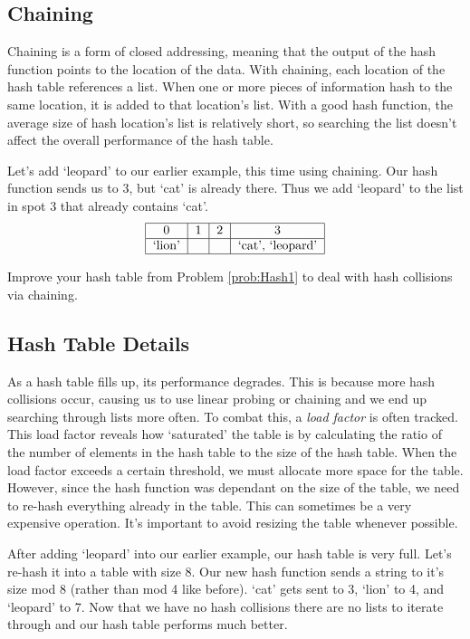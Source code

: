 \subsection*{Chaining}
Chaining is a form of closed addressing, meaning that the output of the hash function points to the location of the data.
With chaining, each location of the hash table references a list.
When one or more pieces of information hash to the same location, it is added to that location's list.
With a good hash function, the average size of hash location's list is relatively short,
so searching the list doesn't affect the overall performance of the hash table.

Let's add `leopard' to our earlier example, this time using chaining.
Our hash function sends us to 3, but `cat' is already there.
Thus we add `leopard' to the list in spot 3 that already contains `cat'.
\[
\begin{tabular}{|c|c|c|c|}
\hline
0 & 1 & 2 & 3\\
\hline
`lion' & & & `cat', `leopard' \\
\hline
\end{tabular}
\]

\begin{problem}
Improve your hash table from Problem \ref{prob:Hash1} to deal with hash collisions via chaining.
\end{problem}

\subsection*{Hash Table Details}
As a hash table fills up, its performance degrades.
This is because more hash collisions occur, causing us to use linear probing or chaining and we end up searching through lists more often.
To combat this, a \emph{load factor} is often tracked.
This load factor reveals how `saturated' the table is by calculating the ratio of the number of elements in the hash table to the size of the hash table.
When the load factor exceeds a certain threshold, we must allocate more space for the table.
However, since the hash function was dependant on the size of the table, we need to re-hash everything already in the table.
This can sometimes be a very expensive operation.
It's important to avoid resizing the table whenever possible.

After adding `leopard' into our earlier example, our hash table is very full. Let's re-hash it into a table with size 8.
Our new hash function sends a string to it's size mod 8 (rather than mod 4 like before).
`cat' gets sent to 3, `lion' to 4, and `leopard' to 7.
Now that we have no hash collisions there are no lists to iterate through and our hash table performs much better.

